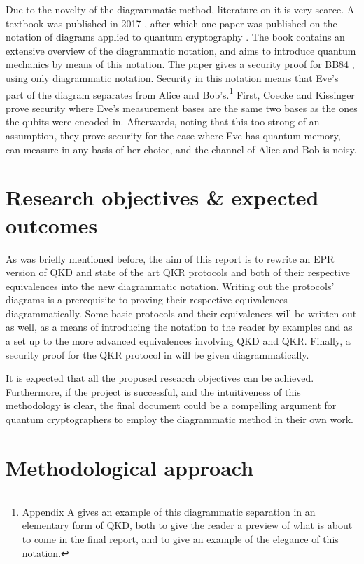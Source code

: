 \documentclass[%
 reprint,
nofootinbib,
 amsmath,amssymb,
 aps,
]{revtex4-2}
\begin{document}
Due to the novelty of the diagrammatic method, literature on it is very scarce. A textbook was published in 2017 \cite{Coecke2017}, after which one paper was published on the notation of diagrams applied to quantum cryptography \cite{Kissinger2017}. The book contains an extensive overview of the diagrammatic notation, and aims to introduce quantum mechanics by means of this notation. The paper gives a security proof for BB84 \cite{Coecke2017}, using only diagrammatic notation. Security in this notation means that Eve's part of the diagram separates from Alice and Bob's.\footnote{Appendix A gives an example of this diagrammatic separation in an elementary form of QKD, both to give the reader a preview of what is about to come in the final report, and to give an example of the elegance of this notation.} First, Coecke and Kissinger prove security where Eve's measurement bases are the same two bases as the ones the qubits were encoded in.  Afterwards, noting that this too strong of an assumption, they prove security for the case where Eve has quantum memory, can measure in any basis of her choice, and the channel of Alice and Bob is noisy.

\section{Research objectives \& expected outcomes}

As was briefly mentioned before, the aim of this report is to rewrite an EPR version of QKD and state of the art QKR protocols and both of their respective equivalences into the new diagrammatic notation. Writing out the protocols' diagrams is a prerequisite to proving their respective equivalences diagrammatically. Some basic protocols and their equivalences will be written out as well, as a means of introducing the notation to the reader by examples and as a set up to the more advanced equivalences involving QKD and QKR. Finally, a security proof for the QKR protocol in \cite{cryptoeprint:2019:875} will be given diagrammatically. 

It is expected that all the proposed research objectives can be achieved. Furthermore, if the project is successful, and the intuitiveness of this methodology is clear, the final document could be a compelling argument for quantum cryptographers to employ the diagrammatic method in their own work.


\section{Methodological approach}
\end{document}
